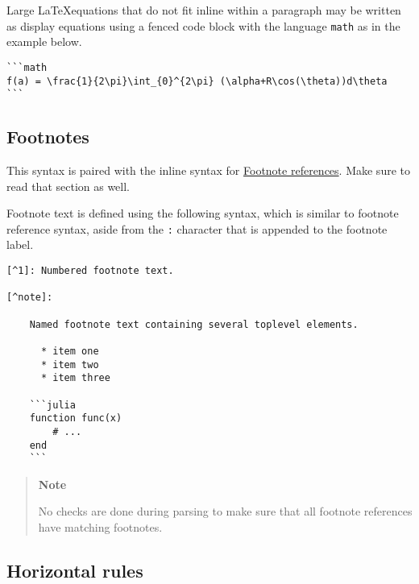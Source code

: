 Large  \LaTeX  equations that do not fit inline within a paragraph may be written as display equations using a fenced code block with the {\textquotedbl}language{\textquotedbl} \texttt{math} as in the example below.




\begin{verbatim}
```math
f(a) = \frac{1}{2\pi}\int_{0}^{2\pi} (\alpha+R\cos(\theta))d\theta
```
\end{verbatim}



\hypertarget{1021238270223877775}{}


\subsection{Footnotes}



This syntax is paired with the inline syntax for \hyperlink{1545049731521220959}{Footnote references}. Make sure to read that section as well.



Footnote text is defined using the following syntax, which is similar to footnote reference syntax, aside from the \texttt{:} character that is appended to the footnote label.




\begin{lstlisting}
[^1]: Numbered footnote text.

[^note]:

    Named footnote text containing several toplevel elements.

      * item one
      * item two
      * item three

    ```julia
    function func(x)
        # ...
    end
    ```
\end{lstlisting}



\begin{quote}
\textbf{Note}

No checks are done during parsing to make sure that all footnote references have matching footnotes.

\end{quote}


\hypertarget{5663489325501471007}{}


\subsection{Horizontal rules}



